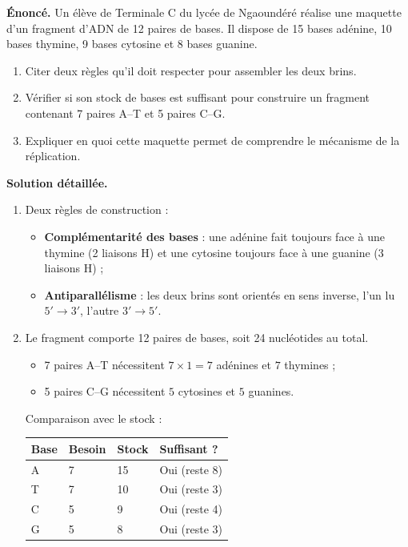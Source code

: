 \documentclass[11pt]{article}
\begin{document}
\begin{exoresolu}
\textbf{Énoncé.} Un élève de Terminale C du lycée de Ngaoundéré réalise une maquette d'un fragment d'ADN de 12 paires de bases. Il dispose de 15 bases adénine, 10 bases thymine, 9 bases cytosine et 8 bases guanine.
\begin{enumerate}
\item Citer deux règles qu'il doit respecter pour assembler les deux brins.
\item Vérifier si son stock de bases est suffisant pour construire un fragment contenant 7 paires A--T et 5 paires C--G.
\item Expliquer en quoi cette maquette permet de comprendre le mécanisme de la réplication.
\end{enumerate}
\tcblower
\textbf{Solution détaillée.}
\begin{enumerate}
\item Deux règles de construction :
\begin{itemize}
\item \textbf{Complémentarité des bases} : une adénine fait toujours face à une thymine (2 liaisons H) et une cytosine toujours face à une guanine (3 liaisons H) ;
\item \textbf{Antiparallélisme} : les deux brins sont orientés en sens inverse, l'un lu $5' \rightarrow 3'$, l'autre $3' \rightarrow 5'$.
\end{itemize}
\item Le fragment comporte 12 paires de bases, soit 24 nucléotides au total.
\begin{itemize}
\item 7 paires A--T nécessitent $7 \times 1 = 7$ adénines et $7$ thymines ;
\item 5 paires C--G nécessitent $5$ cytosines et $5$ guanines.
\end{itemize}
Comparaison avec le stock :
\begin{center}
\begin{tabularx}{\linewidth}{|l|X|X|X|}\hline
\rowcolor{popblueL} \textbf{Base} & \textbf{Besoin} & \textbf{Stock} & \textbf{Suffisant ?} \\ \hline
A & 7 & 15 & Oui (reste 8) \\ \hline
T & 7 & 10 & Oui (reste 3) \\ \hline
C & 5 & 9 & Oui (reste 4) \\ \hline
G & 5 & 8 & Oui (reste 3) \\ \hline
\end{tabularx}

\end{center}
\end{enumerate}
\end{exoresolu}
\end{document}
